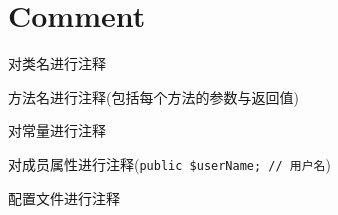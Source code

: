 \section{Comment}

\begin{compactitem}
\item 对类名进行注释 
\item 方法名进行注释(包括每个方法的参数与返回值)
\item 对常量进行注释 
\item 对成员属性进行注释(\texttt{public \$userName; // 用户名})
\item 配置文件进行注释
\end{compactitem}







\begin{lstlisting}[language=PHP]

\end{lstlisting}



\begin{lstlisting}[language=PHP]

\end{lstlisting}



\begin{lstlisting}[language=PHP]

\end{lstlisting}


\begin{lstlisting}[language=PHP]

\end{lstlisting}


\begin{lstlisting}[language=PHP]

\end{lstlisting}



\begin{lstlisting}[language=PHP]

\end{lstlisting}



\begin{lstlisting}[language=PHP]

\end{lstlisting}


\begin{lstlisting}[language=PHP]

\end{lstlisting}


\begin{lstlisting}[language=PHP]

\end{lstlisting}



\begin{lstlisting}[language=PHP]

\end{lstlisting}



\begin{lstlisting}[language=PHP]

\end{lstlisting}
